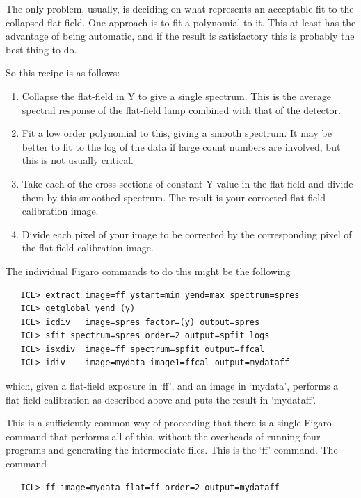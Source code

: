    The only problem, usually, is deciding on what represents an
   acceptable fit to the collapsed flat-field.  One approach is to fit a
   polynomial to it.  This at least has the advantage of being
   automatic, and if the result is satisfactory this is probably the
   best thing to do.

   So this recipe is as follows:

\begin{enumerate}
\item
   Collapse the flat-field in Y to give a single spectrum.  This is the
   average spectral response of the flat-field lamp combined with that
   of the detector.
\item
   Fit a low order polynomial to this, giving a smooth spectrum.  It may
   be better to fit to the log of the data if large count numbers are
   involved, but this is not usually critical.
\item
   Take each of the cross-sections of constant Y value in the flat-field
   and divide them by this smoothed spectrum.  The result is your
   corrected flat-field calibration image.
\item
   Divide each pixel of your image to be corrected by the corresponding
   pixel of the flat-field calibration image.
\end{enumerate}

The individual Figaro commands to do this might be the following

\begin{verbatim}
   ICL> extract image=ff ystart=min yend=max spectrum=spres
   ICL> getglobal yend (y)
   ICL> icdiv   image=spres factor=(y) output=spres
   ICL> sfit spectrum=spres order=2 output=spfit logs
   ICL> isxdiv  image=ff spectrum=spfit output=ffcal
   ICL> idiv    image=mydata image1=ffcal output=mydataff
\end{verbatim}

   which, given a flat-field exposure in `ff', and an image in `mydata',
   performs a flat-field calibration as described above and puts the
   result in `mydataff'.

   This is a sufficiently common way of proceeding that there is a
   single Figaro command that performs all of this, without the
   overheads of running four programs and generating the intermediate
   files.  This is the `ff' command. The command

\begin{verbatim}
   ICL> ff image=mydata flat=ff order=2 output=mydataff
\end{verbatim}

